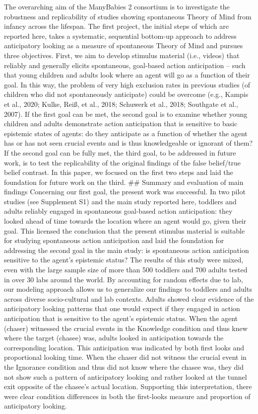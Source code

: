 \documentclass[
  man,floatsintext]{apa6}
\begin{document}
The overarching aim of the ManyBabies 2 consortium is to investigate the robustness and replicability of studies showing spontaneous Theory of Mind from infancy across the lifespan. The first project, the initial steps of which are reported here, takes a systematic, sequential bottom-up approach to address anticipatory looking as a measure of spontaneous Theory of Mind and pursues three objectives. First, we aim to develop stimulus material (i.e., videos) that reliably and generally elicits spontaneous, goal-based action anticipation -- such that young children and adults look where an agent will go as a function of their goal. In this way, the problem of very high exclusion rates in previous studies (of children who did not spontaneously anticipate) could be overcome (e.g., Kampis et al., 2020; Kulke, Reiß, et al., 2018; Schuwerk et al., 2018; Southgate et al., 2007). If the first goal can be met, the second goal is to examine whether young children and adults demonstrate action anticipation that is sensitive to basic epistemic states of agents: do they anticipate as a function of whether the agent has or has not seen crucial events and is thus knowledgeable or ignorant of them? If the second goal can be fully met, the third goal, to be addressed in future work, is to test the replicability of the original findings of the false belief/true belief contrast. In this paper, we focused on the first two steps and laid the foundation for future work on the third.
\#\# Summary and evaluation of main findings
Concerning our first goal, the present work was successful. In two pilot studies (see Supplement S1) and the main study reported here, toddlers and adults reliably engaged in spontaneous goal-based action anticipation: they looked ahead of time towards the location where an agent would go, given their goal. This licensed the conclusion that the present stimulus material is suitable for studying spontaneous action anticipation and laid the foundation for addressing the second goal in the main study: is spontaneous action anticipation sensitive to the agent's epistemic status?
The results of this study were mixed, even with the large sample size of more than 500 toddlers and 700 adults tested in over 30 labs around the world. By accounting for random effects due to lab, our modeling approach allows us to generalize our findings to toddlers and adults across diverse socio-cultural and lab contexts.
Adults showed clear evidence of the anticipatory looking patterns that one would expect if they engaged in action anticipation that is sensitive to the agent's epistemic status. When the agent (chaser) witnessed the crucial events in the Knowledge condition and thus knew where the target (chasee) was, adults looked in anticipation towards the corresponding location. This anticipation was indicated by both first looks and proportional looking time. When the chaser did not witness the crucial event in the Ignorance condition and thus did not know where the chasee was, they did not show such a pattern of anticipatory looking and rather looked at the tunnel exit opposite of the chasee's actual location. Supporting this interpretation, there were clear condition differences in both the first-looks measure and proportion of anticipatory looking.
\end{document}

